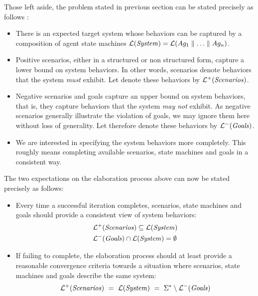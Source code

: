 Those left aside, the problem stated in previous section can be stated precisely as follows \cite{Uchitel:2007}:
\begin{itemize}
\item There is an expected target system whose behaviors can be captured by a composition of agent state machines $\mathcal{L}(\mbox{\emph{System}}) = \mathcal{L}(Ag_1 \parallel \ldots \parallel Ag_n)$.
\item Positive scenarios, either in a structured or non structured form, capture a lower bound on system behaviors. In other words, scenarios denote behaviors that the system \emph{must} exhibit. Let denote these behaviors by $\mathcal{L}^+(\mbox{\emph{Scenarios}})$.
\item Negative scenarios and goals capture an upper bound on system behaviors, that is, they capture behaviors that the system \emph{may not} exhibit. As negative scenarios generally illustrate the violation of goals, we may ignore them here without loss of generality. Let therefore denote these behaviors by $\mathcal{L}^-(\mbox{\emph{Goals}})$.
\item We are interested in specifying the system behaviors more completely. This roughly means completing available scenarios, state machines and goals in a consistent way.
\end{itemize}

The two expectations on the elaboration process above can now be stated precisely as follows:
\begin{itemize}
\item Every time a successful iteration completes, scenarios, state machines and goals should provide a consistent view of system behaviors:
\begin{align}
&\mathcal{L}^+(\mbox{\emph{Scenarios}}) \subseteq \mathcal{L}(\mbox{\emph{System}})\label{elaboration-process-consistency-1}\\
&\mathcal{L}^-(\mbox{\emph{Goals}}) \cap \mathcal{L}(\mbox{\emph{System}}) = \emptyset\label{elaboration-process-consistency-2}
\end{align}
\item If failing to complete, the elaboration process should at least provide a reasonable convergence criteria towards a situation where scenarios, state machines and goals describe the same system:
\begin{align}
\mathcal{L}^+(\mbox{\emph{Scenarios}})~=~\mathcal{L}(\mbox{\emph{System}})~=~\Sigma^* \setminus \mathcal{L}^-(\mbox{\emph{Goals}})
\end{align}
\end{itemize}

